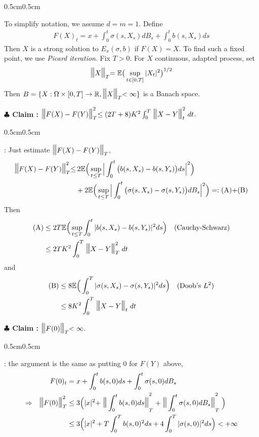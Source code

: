 \documentclass[12pt,a4paper]{article}
\newenvironment{proof}
{\begin{changemargin}{0.5cm}{0.5cm} 
	}%
	{\end{changemargin}
}
\newenvironment{subproof}
{\begin{changemargin}{0.5cm}{0.5cm} 
	}%
	{\end{changemargin}
}
\newenvironment{p}
{\begin{proof} 
	}%
	{\end{proof}
}
\begin{document}
\begin{p}
\pf To simplify notation, we assume $d=m=1$. Define
\begin{align*}
F(X)_t = x + \int_0^t \sigma(s, X_s) dB_s + \int_0^t b(s, X_s) ds
\end{align*}
Then $X$ is a strong solution to $E_x(\sigma, b)$ if $F(X)=X$. To find such a fixed point, we use \emph{Picard iteration}. Fix $T>0$. For $X$ continuous, adapted process, set
\begin{align*}
\tnorms{X}{T} = \avg \big( \sup_{t\in [0, T]} |X_t|^2 \big)^{1/2}
\end{align*}
Then $B = \{X : \Omega \times [0, T] \rightarrow \reals, \tnorms{X}{T} < \infty \}$ is a Banach space.

\textbf{$\clubsuit$ Claim :} $\tnorms{F(X) - F(Y)}{T}^2 \leq (2T+8)K^2 \int_0^T \tnorms{X-Y}{t}^2 dt$. 
\begin{subproof}
: Just estimate $\tnorms{F(X)-F(Y)}{T}$,
\begin{align*}
\tnorms{F(X)-F(Y)}{T}^2 \leq & \, 2\avg \Big( \sup_{t\leq T} \Big| \int_0^t \big( b(s, X_s) - b(s, Y_s) \big) ds \Big|^2  \Big) \\
& + 2\avg \Big( \sup_{t\leq T} \Big| \int_0^t \big( \sigma(s, X_s) - \sigma(s, Y_s) \big) dB_s \Big|^2 \Big) =: \text{(A)+(B)}
\end{align*}
Then
\begin{align*}
\text{(A)} & \leq 2T \avg \Big( \sup_{t\leq T} \int_0^t |b(s, X_s) - b(s, Y_s)|^2 ds \Big) \quad \text{(Cauchy-Schwarz)} \\
& \leq 2 TK^2 \int_0^T \tnorms{X-Y}{T}^2  dt 
\end{align*}
and
\begin{align*}
\text{(B)} & \leq 8\avg \Big( \int_0^T |\sigma(s, X_s) - \sigma(s, Y_s)|^2 ds \Big) \quad \text{(Doob's }L^2) \\
& \leq 8K^2  \int_0^T \tnorms{X-Y}{t} dt
\end{align*}
\end{subproof}
\textbf{$\clubsuit$ Claim :} $\tnorms{F(0)}{T} < \infty$.
\begin{subproof}
: the argument is the same as putting 0 for $F(Y)$ above,
\begin{align*}
 F(0)_t &= x + \int_0^t b(s, 0) ds + \int_0^t \sigma(s, 0) dB_s \\
\Rightarrow \quad \tnorms{F(0)}{T}^2 &\leq 3\Big( |x|^2 + \tnorms{\int_0^t b(s, 0) ds}{T}^2 + \tnorms{\int_0^t \sigma(s, 0) dB_s}{T}^2 \Big) \\
&\leq 3\Big( |x|^2 +  T\int_0^T b(s, 0)^2 ds + 4\int_0^T |\sigma(s,0)|^2 ds  \Big) < + \infty

\end{align*}
\end{subproof}
\end{p}
\end{document}

